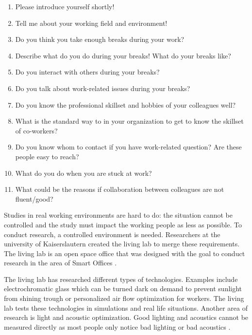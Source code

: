 \documentclass[english]{tktltiki}
\begin{document}
\begin{enumerate}
\item Please introduce yourself shortly!
\item Tell me about your working field and environment! 
\item Do you think you take enough breaks during your work? 
\item Describe what do you do during your breaks! What do your breaks like? 
\item Do you interact with others during your breaks? 
\item Do you talk about work-related issues during your breaks? 
\item Do you know the professional skillset and hobbies of your colleagues well?
\item What is the standard way to in your organization to get to know the skillset of co-workers? 
\item Do you know whom to contact if you have work-related question? Are these people easy to reach? 
\item What do you do when you are stuck at work? 
\item What could be the reasons if collaboration between colleagues are not fluent/good? 
\end{enumerate}

\label{sec:related-work}
Studies in real working environments are hard to do: the situation cannot be controlled and the 
study must impact the working people as less as possible. To conduct research, a controlled 
environment is needed. Researchers at the university of Kaiserslautern created the living lab to 
merge these requirements. The living lab is an open space office that was designed with the goal to 
conduct research in the area of Smart Offices \cite{living-lab}.

The living lab has researched different types of technologies. Examples include electrochromatic 
glass which can be turned dark on demand to prevent sunlight from shining trough or personalized air 
flow optimization for workers. The living lab tests these technologies in simulations and real life 
situations. Another area of research is light and acoustic optimization. Good lighting and acoustics 
cannot be measured directly as most people only notice bad lighting or bad acoustics \cite{living-lab}.
\end{document}
